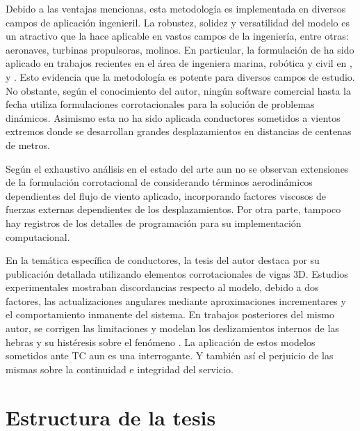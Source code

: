 Debido a las ventajas mencionas, esta metodología es implementada en diversos campos de aplicación ingenieril. La robustez, solidez y versatilidad del modelo es un atractivo que la hace aplicable en vastos campos de la ingeniería, entre otras: aeronaves, turbinas propulsoras, molinos. En particular, la formulación de \citep{Le2014} ha sido aplicado en trabajos recientes en el área de ingeniera marina, robótica y civil en \citep{albino2018co}, \cite{asadi2019multibody} y \cite{viana2020formulation}. Esto evidencia que la metodología es potente para diversos campos de estudio. No obstante, según el conocimiento del autor, ningún software comercial hasta la fecha utiliza formulaciones corrotacionales para la solución de problemas dinámicos. Asimismo esta no ha sido aplicada conductores sometidos a vientos extremos donde se desarrollan grandes desplazamientos en distancias de centenas de metros.

Según el exhaustivo análisis en el estado del arte aun no se observan extensiones de la formulación corrotacional de \cite{Le2014} considerando términos aerodinámicos dependientes del flujo de viento aplicado, incorporando factores viscosos de fuerzas externas dependientes de los desplazamientos. Por otra parte, tampoco hay registros de los detalles de programación para su implementación computacional.

En la temática específica de conductores, la tesis del autor \citet{foti2013corotational} destaca por su publicación detallada utilizando elementos corrotacionales de vigas 3D. Estudios experimentales mostraban discordancias respecto al modelo, debido a dos factores, las actualizaciones angulares mediante aproximaciones incrementares y el comportamiento inmanente del sistema. En trabajos posteriores del mismo autor, se corrigen las limitaciones y modelan los deslizamientos internos de las hebras y su histéresis sobre el fenómeno \citet{foti2018finite}. La aplicación de estos modelos sometidos ante \gls{TC} aun es una interrogante. Y también así el perjuicio de las mismas sobre la continuidad e integridad del servicio. 

\section{Estructura de la tesis}

